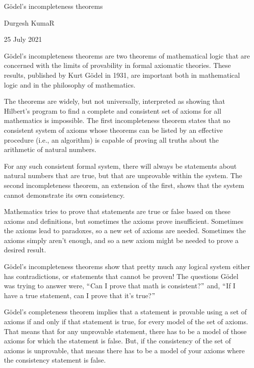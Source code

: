 \documentclass[11pt]{article}
\begin{document}
\begin{center}
{\huge Gödel's incompleteness theorems}
\end{center}


\begin{center}
{\large Durgesh KumaR}
\end{center}


\begin{center}
{\large 25 July 2021}
\end{center}


{\Large Gödel's incompleteness theorems are two theorems of mathematical logic that are concerned with the limits of provability in formal axiomatic theories. These results, published by Kurt Gödel in 1931, are important both in mathematical logic and in the philosophy of mathematics.\par}

{\Large  The theorems are widely, but not universally, interpreted as showing that Hilbert's program to find a complete and consistent set of axioms for all mathematics is impossible. The first incompleteness theorem states that no consistent system of axioms whose theorems can be listed by an effective procedure (i.e., an algorithm) is capable of proving all truths about the arithmetic of natural numbers.\par}

{\Large  For any such consistent formal system, there will always be statements about natural numbers that are true, but that are unprovable within the system. The second incompleteness theorem, an extension of the first, shows that the system cannot demonstrate its own consistency. \par}

{\Large Mathematics tries to prove that statements are true or false based on these axioms and definitions, but sometimes the axioms prove insufficient. Sometimes the axioms lead to paradoxes, so a new set of axioms are needed. Sometimes the axioms simply aren’t enough, and so a new axiom might be needed to prove a desired result.\par}

{\Large  Gödel’s incompleteness theorems show that pretty much any logical system either has contradictions, or statements that cannot be proven! The questions Gödel was trying to answer were, $``$Can I prove that math is consistent?$"$ and, $``$If I have a true statement, can I prove that it’s true?$"$\par}

{\Large Gödel’s completeness theorem implies that a statement is provable using a set of axioms if and only if that statement is true, for every model of the set of axioms. That means that for any unprovable statement, there has to be a model of those axioms for which the statement is false. But, if the consistency of the set of axioms is unprovable, that means there has to be a model of your axioms where the consistency statement is false.\par}
\end{document}
